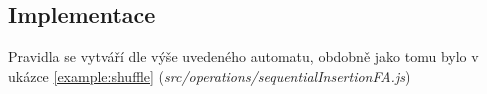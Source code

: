 \subsection{Implementace}
Pravidla se vytváří dle výše uvedeného automatu, obdobně jako tomu bylo v ukázce \ref{example:shuffle}
(\textit{src/operations/sequentialInsertionFA.js})
